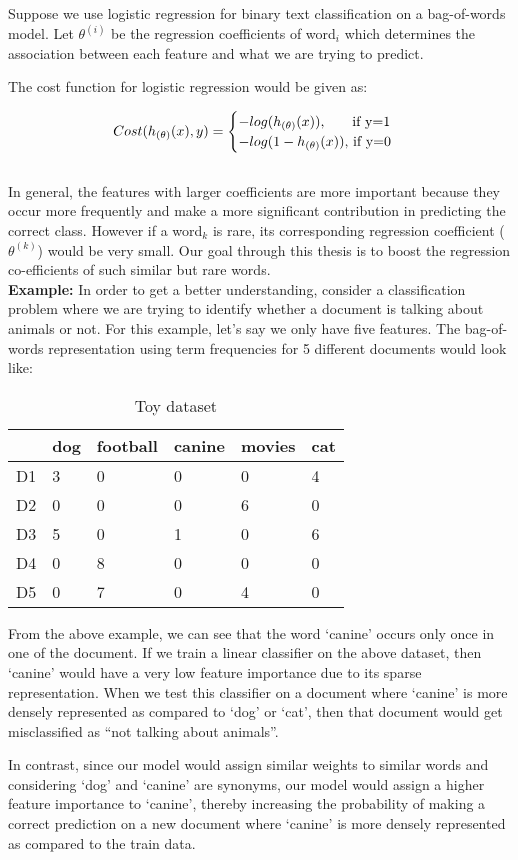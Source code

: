 Suppose we use logistic regression for binary text classification on a bag-of-words model. Let $\theta^{(i)}$ be the regression coefficients of word$_{i}$ which determines the association between each feature and what we are trying to predict.

\noindent The cost function for logistic regression would be given as:

\begin{equation}\label{lr_cost_fn_eq}
Cost(h_{(\theta)}(x), y) = 
\begin{cases}
-log(h_{(\theta)}(x)), $\qquad if y=1$
\\
-log(1-h_{(\theta)}(x)), $ if y=0$
\end{cases}
\end{equation}\\

In general, the features with larger coefficients are more important because they occur more frequently and make a more significant contribution in predicting the correct class. However if a word$_{k}$ is rare, its corresponding regression coefficient ($\theta^{(k)}$) would be very small. Our goal through this thesis is to boost the regression co-efficients of such similar but rare words.\\

\noindent \textbf{Example:} In order to get a better understanding, consider a classification problem where we are trying to identify whether a document is talking about animals or not. For this example, let's say we only have five features. The bag-of-words representation using term frequencies for 5 different documents would look like:

\begin{table}[htbp]
\centering
\begin{tabular}{l|lllll}
 & dog & \multicolumn{1}{c}{football} & \multicolumn{1}{c}{canine} & movies & cat \\\hline
D1 & 3 & 0 & 0 & 0 & 4 \\
D2 & 0 & 0 & 0 & 6 & 0 \\
D3 & 5 & 0 & 1 & 0 & 6 \\
D4 & 0 & 8 & 0 & 0 & 0 \\
D5 & 0 & 7 & 0 & 4 & 0
\end{tabular}
\caption{Toy dataset}
\end{table}

From the above example, we can see that the word ‘canine’ occurs only once in one of the document. If we train a linear classifier on the above dataset, then ‘canine’ would have a very low feature importance due to its sparse representation. When we test this classifier on a document where ‘canine’ is more densely represented as compared to ‘dog’ or ‘cat’, then that document would get misclassified as “not talking about animals”. 

In contrast, since our model would assign similar weights to similar words and considering ‘dog’ and ‘canine’ are synonyms, our model would assign a higher feature importance to ‘canine’, thereby increasing the probability of making a correct prediction on a new document where ‘canine’ is more densely represented as compared to the train data.